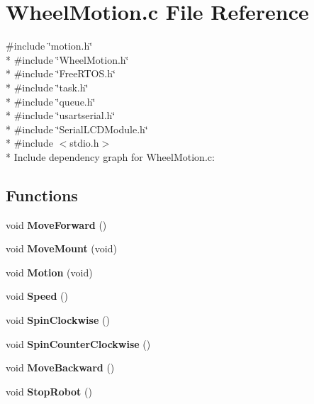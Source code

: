 \section{Wheel\+Motion.\+c File Reference}
\label{_wheel_motion_8c}
{\ttfamily \#include \char`\"{}motion.\+h\char`\"{}}\\*
{\ttfamily \#include \char`\"{}Wheel\+Motion.\+h\char`\"{}}\\*
{\ttfamily \#include \char`\"{}Free\+R\+T\+O\+S.\+h\char`\"{}}\\*
{\ttfamily \#include \char`\"{}task.\+h\char`\"{}}\\*
{\ttfamily \#include \char`\"{}queue.\+h\char`\"{}}\\*
{\ttfamily \#include \char`\"{}usartserial.\+h\char`\"{}}\\*
{\ttfamily \#include \char`\"{}Serial\+L\+C\+D\+Module.\+h\char`\"{}}\\*
{\ttfamily \#include $<$stdio.\+h$>$}\\*
Include dependency graph for Wheel\+Motion.\+c\+:
\subsection*{Functions}
\begin{DoxyCompactItemize}
\item 
void {\bf Move\+Forward} ()
\item 
void {\bf Move\+Mount} (void)
\item 
void {\bf Motion} (void)
\item 
void {\bf Speed} ()
\item 
void {\bf Spin\+Clockwise} ()
\item 
void {\bf Spin\+Counter\+Clockwise} ()
\item 
void {\bf Move\+Backward} ()
\item 
void {\bf Stop\+Robot} ()
\end{DoxyCompactItemize}
